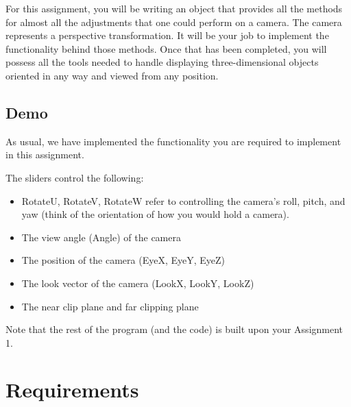 \documentclass[10pt,twocolumn]{article}
\begin{document}
For this assignment, you will be writing an object that provides all the methods for almost all the adjustments that one could perform on a camera. The camera represents a perspective transformation. It will be your job to implement the functionality behind those methods. Once that has been completed, you will possess all the tools needed to handle displaying three-dimensional objects oriented in any way and viewed from any position.


\subsection{Demo}
As usual, we have implemented the functionality you are required to implement in this assignment.

The sliders control the following:
\begin{itemize}
\item RotateU, RotateV, RotateW refer to controlling the camera's roll, pitch, and yaw (think of the orientation of how you would hold a camera).
\item The view angle (Angle) of the camera
\item The position of the camera (EyeX, EyeY, EyeZ)
\item The look vector of the camera (LookX, LookY, LookZ)
\item The near clip plane and far clipping plane
\end{itemize}

Note that the rest of the program (and the code) is built upon your Assignment 1.

\section{Requirements}
\end{document}
